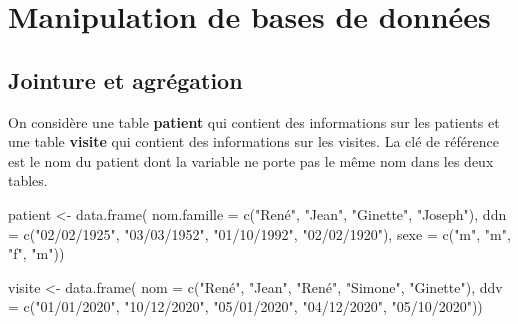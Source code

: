 \documentclass[
]{book}
\newenvironment{Shaded}{\begin{snugshade}}{\end{snugshade}}
\newcommand{\AttributeTok}[1]{\textcolor[rgb]{0.77,0.63,0.00}{#1}}
\newcommand{\FunctionTok}[1]{\textcolor[rgb]{0.00,0.00,0.00}{#1}}
\newcommand{\NormalTok}[1]{#1}
\newcommand{\OtherTok}[1]{\textcolor[rgb]{0.56,0.35,0.01}{#1}}
\newcommand{\StringTok}[1]{\textcolor[rgb]{0.31,0.60,0.02}{#1}}
\theoremstyle{definition}
\theoremstyle{definition}
\theoremstyle{definition}
\theoremstyle{definition}
\theoremstyle{remark}
\begin{document}
\hypertarget{manipulation-de-bases-de-donnuxe9es}{%
\section{Manipulation de bases de données}\label{manipulation-de-bases-de-donnuxe9es}}

\hypertarget{jointure-et-agruxe9gation}{%
\subsection{Jointure et agrégation}\label{jointure-et-agruxe9gation}}

On considère une table \textbf{patient} qui contient des informations sur les patients et une table \textbf{visite} qui contient des informations sur les visites. La clé de référence est le nom du patient dont la variable ne porte pas le même nom dans les deux tables.

\begin{Shaded}
\begin{Highlighting}[]
\NormalTok{patient }\OtherTok{\textless{}{-}} \FunctionTok{data.frame}\NormalTok{(}
   \AttributeTok{nom.famille =} \FunctionTok{c}\NormalTok{(}\StringTok{"René"}\NormalTok{, }\StringTok{"Jean"}\NormalTok{, }\StringTok{"Ginette"}\NormalTok{, }\StringTok{"Joseph"}\NormalTok{),}
   \AttributeTok{ddn =} \FunctionTok{c}\NormalTok{(}\StringTok{"02/02/1925"}\NormalTok{, }\StringTok{"03/03/1952"}\NormalTok{, }\StringTok{"01/10/1992"}\NormalTok{, }\StringTok{"02/02/1920"}\NormalTok{),}
   \AttributeTok{sexe =} \FunctionTok{c}\NormalTok{(}\StringTok{"m"}\NormalTok{, }\StringTok{"m"}\NormalTok{, }\StringTok{"f"}\NormalTok{, }\StringTok{"m"}\NormalTok{))}
\end{Highlighting}
\end{Shaded}

\begin{Shaded}
\begin{Highlighting}[]
\NormalTok{visite }\OtherTok{\textless{}{-}} \FunctionTok{data.frame}\NormalTok{(}
   \AttributeTok{nom =} \FunctionTok{c}\NormalTok{(}\StringTok{"René"}\NormalTok{, }\StringTok{"Jean"}\NormalTok{, }\StringTok{"René"}\NormalTok{, }\StringTok{"Simone"}\NormalTok{, }\StringTok{"Ginette"}\NormalTok{),}
   \AttributeTok{ddv =} \FunctionTok{c}\NormalTok{(}\StringTok{"01/01/2020"}\NormalTok{, }\StringTok{"10/12/2020"}\NormalTok{, }\StringTok{"05/01/2020"}\NormalTok{, }\StringTok{"04/12/2020"}\NormalTok{, }\StringTok{"05/10/2020"}\NormalTok{))}
\end{Highlighting}
\end{Shaded}
\end{document}
